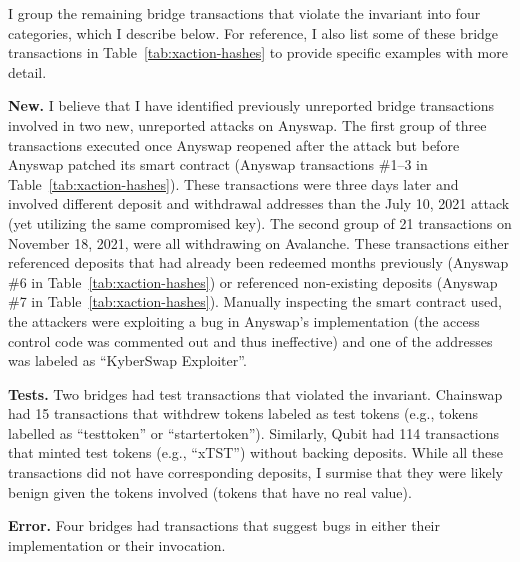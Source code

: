 I group the remaining bridge transactions that violate the invariant
into four categories, which I describe below.  For reference, I also
list some of these bridge transactions in
Table~\ref{tab:xaction-hashes} to provide specific
examples with more detail.



\newcommand{\pgraph}[1]{\vspace*{0.1in}\noindent\textbf{#1}}

\pgraph{New.}  I believe that I have identified
previously unreported bridge transactions involved in two new,
unreported attacks on Anyswap.
The first group of three transactions executed once Anyswap reopened
after the attack but before Anyswap patched its smart contract
(Anyswap transactions \#1--3 in Table~\ref{tab:xaction-hashes}).  These transactions were three days later and involved
different deposit and withdrawal addresses than the July 10, 2021
attack (yet utilizing the same compromised key).  The second group of 21 transactions on November 18, 2021,
were all withdrawing on Avalanche.  These
transactions either referenced deposits that had already been redeemed
months previously (Anyswap \#6 in Table~\ref{tab:xaction-hashes}) or referenced non-existing deposits (Anyswap \#7 in Table~\ref{tab:xaction-hashes}).  Manually
inspecting the smart contract used, the attackers were exploiting a
bug in Anyswap's implementation (the access control code was commented
out and thus ineffective) and one of the addresses was labeled as ``KyberSwap Exploiter''. 


\pgraph{Tests.}  Two bridges had test transactions that violated the
invariant.
%
Chainswap had 15 transactions that withdrew tokens labeled as test
tokens (e.g., tokens labelled as ``testtoken'' or ``startertoken''). Similarly, Qubit had 114 transactions that minted test tokens (e.g., ``xTST'') without backing deposits.
While all these transactions did not have corresponding deposits, I surmise that they were likely benign given the tokens involved (tokens that have no real value).




\pgraph{Error.} Four bridges had transactions that suggest bugs in
either their implementation or their invocation.

